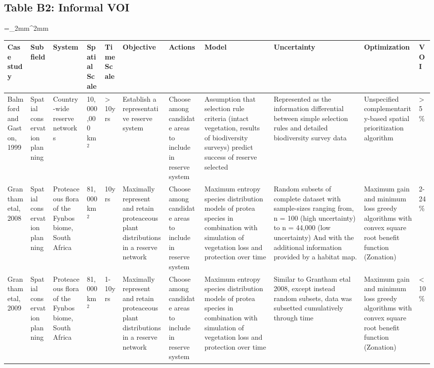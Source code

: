 \begin{landscape}
\subsection*{Table B2: Informal VOI}
\bgroup
\linespread{1}\scriptsize
\extrarowsep=_2mm^2mm
\begin{longtabu} to 230mm {|X[1,l] X[1,l] X[1,l] X[1,l] X[.8,l] X[1,l] X[1,l] X[1,l] X[1,l] X[1,l] X[.5,l]|} \hline 
Case study & Subfield & System & Spatial Scale & Time Scale & Objective & Actions & Model & Uncertainty & Optimization & VOI \\ \hline
Balmford and Gaston, 1999 & Spatial conservation planning & Country-wide reserve networks & 10,000,000 km$^2$ & > 10yrs & Establish a representative reserve system & Choose among candidate areas to include in reserve system & Assumption that selection rule criteria (intact vegetation, results of biodiversity surveys) predict success of reserve selected  & Represented as the information differential between simple selection rules and detailed biodiversity survey data & Unspecified complementarity-based spatial prioritization algorithm & >5\% \\ 
Grantham etal, 2008 & Spatial conservation planning & Proteaceous flora of the Fynbos biome, South Africa  & 81,000 km$^2$ & 10yrs & Maximally represent and retain proteaceous plant distributions in a reserve network & Choose among candidate areas to include in reserve system & Maximum entropy species distribution models of protea species in combination with simulation of vegetation loss and protection over time & Random subsets of complete dataset with sample-sizes ranging from, n = 100 (high uncertainty) to n = 44,000 (low uncertainty) And with the additional information provided by a habitat map. & Maximum gain and minimum loss greedy algorithms with convex square root benefit function (Zonation) & 2-24\% \\ 
Grantham etal, 2009 & Spatial conservation planning & Proteaceous flora of the Fynbos biome, South Africa  & 81,000 km$^2$ & 1-10yrs & Maximally represent and retain proteaceous plant distributions in a reserve network & Choose among candidate areas to include in reserve system & Maximum entropy species distribution models of protea species in combination with simulation of vegetation loss and protection over time & Similar to Grantham etal 2008, except instead random subsets, data was subsetted cumulatively through time & Maximum gain and minimum loss greedy algorithms with convex square root benefit function (Zonation) & <10\% \\ 

\end{longtabu}
\end{landscape}
